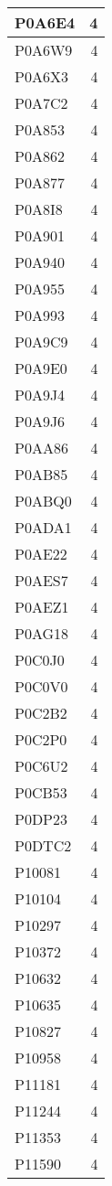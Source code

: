 \documentclass[
]{book}
\theoremstyle{definition}
\theoremstyle{definition}
\theoremstyle{definition}
\theoremstyle{definition}
\theoremstyle{remark}
\begin{document}
\begin{table}
\begin{tabular}{l|r}
\hline
P0A6E4 & 4\\
\hline
P0A6W9 & 4\\
\hline
P0A6X3 & 4\\
\hline
P0A7C2 & 4\\
\hline
P0A853 & 4\\
\hline
P0A862 & 4\\
\hline
P0A877 & 4\\
\hline
P0A8I8 & 4\\
\hline
P0A901 & 4\\
\hline
P0A940 & 4\\
\hline
P0A955 & 4\\
\hline
P0A993 & 4\\
\hline
P0A9C9 & 4\\
\hline
P0A9E0 & 4\\
\hline
P0A9J4 & 4\\
\hline
P0A9J6 & 4\\
\hline
P0AA86 & 4\\
\hline
P0AB85 & 4\\
\hline
P0ABQ0 & 4\\
\hline
P0ADA1 & 4\\
\hline
P0AE22 & 4\\
\hline
P0AES7 & 4\\
\hline
P0AEZ1 & 4\\
\hline
P0AG18 & 4\\
\hline
P0C0J0 & 4\\
\hline
P0C0V0 & 4\\
\hline
P0C2B2 & 4\\
\hline
P0C2P0 & 4\\
\hline
P0C6U2 & 4\\
\hline
P0CB53 & 4\\
\hline
P0DP23 & 4\\
\hline
P0DTC2 & 4\\
\hline
P10081 & 4\\
\hline
P10104 & 4\\
\hline
P10297 & 4\\
\hline
P10372 & 4\\
\hline
P10632 & 4\\
\hline
P10635 & 4\\
\hline
P10827 & 4\\
\hline
P10958 & 4\\
\hline
P11181 & 4\\
\hline
P11244 & 4\\
\hline
P11353 & 4\\
\hline
P11590 & 4\\

\end{tabular}
\end{table}
\end{document}
